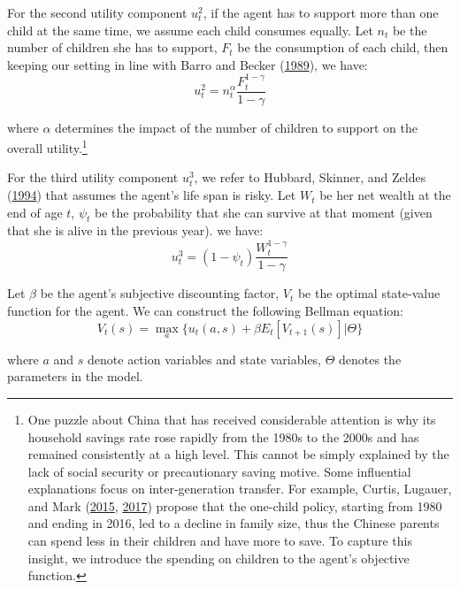 \documentclass[
  12pt,
]{article}
\begin{document}
For the second utility component \(u^2_t\), if the agent has to support
more than one child at the same time, we assume each child consumes
equally. Let \(n_t\) be the number of children she has to support,
\(F_t\) be the consumption of each child, then keeping our setting in
line with Barro and Becker
(\protect\hyperlink{ref-barro_fertility_1989}{1989}), we have:
\begin{equation}
u^2_t = n_t^\alpha\frac{F_t^{1-\gamma}}{1-\gamma}
\end{equation}

where \(\alpha\) determines the impact of the number of children to
support on the overall utility.\footnote{One puzzle about China that has
  received considerable attention is why its household savings rate rose
  rapidly from the 1980s to the 2000s and has remained consistently at a
  high level. This cannot be simply explained by the lack of social
  security or precautionary saving motive. Some influential explanations
  focus on inter-generation transfer. For example, Curtis, Lugauer, and
  Mark (\protect\hyperlink{ref-curtis_demographic_2015}{2015},
  \protect\hyperlink{ref-curtis_demographics_2017}{2017}) propose that
  the one-child policy, starting from 1980 and ending in 2016, led to a
  decline in family size, thus the Chinese parents can spend less in
  their children and have more to save. To capture this insight, we
  introduce the spending on children to the agent's objective function.}

For the third utility component \(u^3_t\), we refer to Hubbard, Skinner,
and Zeldes (\protect\hyperlink{ref-hubbard_importance_1994}{1994}) that
assumes the agent's life span is risky. Let \(W_t\) be her net wealth at
the end of age \(t\), \(\psi_t\) be the probability that she can survive
at that moment (given that she is alive in the previous year). we have:
\begin{equation}
u^3_t = (1-\psi_t) \frac{ W_t^{1-\gamma}}{1-\gamma}
\end{equation}

Let \(\beta\) be the agent's subjective discounting factor, \(V_t\) be
the optimal state-value function for the agent. We can construct the
following Bellman equation: \begin{equation}
V_t(s) = \max_a \{u_t(a,s) + \beta E_t[V_{t+1}(s)]|\Theta\}
\end{equation}

where \(a\) and \(s\) denote action variables and state variables,
\(\Theta\) denotes the parameters in the model.
\end{document}
